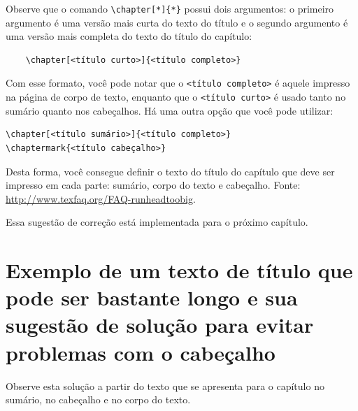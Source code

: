 Observe que o comando \verb|\chapter[*]{*}| possui dois argumentos: o primeiro
argumento é uma versão mais curta do texto do título e o segundo argumento é uma
versão mais completa do texto do título do capítulo:
\begin{verbatim}
    \chapter[<título curto>]{<título completo>}
\end{verbatim}
Com esse formato, você pode notar que o \verb|<título completo>| é aquele impresso
na página de corpo de texto, enquanto que o \verb|<título curto>| é usado tanto no
sumário quanto nos cabeçalhos. Há uma outra opção que você pode utilizar:
\begin{verbatim}
\chapter[<título sumário>]{<título completo>}  
\chaptermark{<título cabeçalho>}
\end{verbatim}
Desta forma, você consegue definir o texto do título do capítulo que deve ser impresso
em cada parte: sumário, corpo do texto e cabeçalho. Fonte: \url{http://www.texfaq.org/FAQ-runheadtoobig}.

Essa sugestão de correção está implementada para o próximo capítulo.

\lipsum[28-35]


\chapter[Exemplo de um título longo e a solução com o cabeçalho]{Exemplo de um texto
de título que pode ser bastante longo e sua sugestão de solução para evitar problemas
com o cabeçalho}

Observe esta solução a partir do texto que se apresenta para o capítulo no sumário,
no cabeçalho e no corpo do texto.

\lipsum[42-51]


